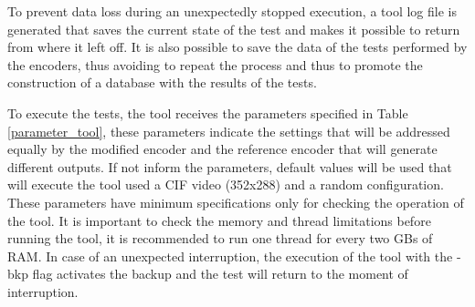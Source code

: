 \documentclass{acm_proc_article-sp}
\begin{document}
To prevent data loss during an unexpectedly stopped execution, a tool log file is generated that saves the current state of the test and makes it possible to return from where it left off. It is also possible to save the data of the tests performed by the encoders, thus avoiding to repeat the process and thus to promote the construction of a database with the results of the tests.

To execute the tests, the tool receives the parameters specified in Table \ref{parameter_tool}, these parameters indicate the settings that will be addressed equally by the modified encoder and the reference encoder that will generate different outputs. If not inform the parameters, default values will be used that will execute the tool used a CIF video (352x288) and a random configuration. 
These parameters have minimum specifications only for checking the operation of the tool. It is important to check the memory and thread limitations before running the tool, it is recommended to run one thread for every two GBs of RAM. In case of an unexpected interruption, the execution of the tool with the -bkp flag activates the backup and the test will return to the moment of interruption.

\FloatBarrier
\end{document}
